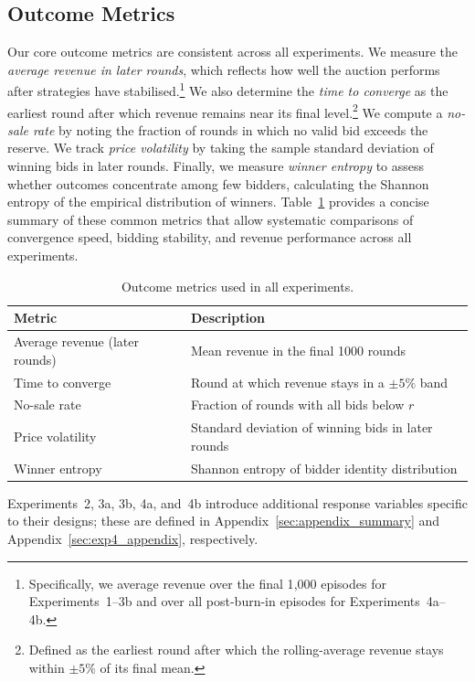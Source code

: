 \subsection{Outcome Metrics}

Our core outcome metrics are consistent across all experiments. We measure the \emph{average revenue in later rounds}, which reflects how well the auction performs after strategies have stabilised.\footnote{Specifically, we average revenue over the final 1{,}000 episodes for Experiments~1--3b and over all post-burn-in episodes for Experiments~4a--4b.} We also determine the \emph{time to converge} as the earliest round after which revenue remains near its final level.\footnote{Defined as the earliest round after which the rolling-average revenue stays within $\pm 5\%$ of its final mean.} We compute a \emph{no-sale rate} by noting the fraction of rounds in which no valid bid exceeds the reserve. We track \emph{price volatility} by taking the sample standard deviation of winning bids in later rounds. Finally, we measure \emph{winner entropy} to assess whether outcomes concentrate among few bidders, calculating the Shannon entropy of the empirical distribution of winners. Table~\ref{tab:outcomes} provides a concise summary of these common metrics that allow systematic comparisons of convergence speed, bidding stability, and revenue performance across all experiments.

\begin{table}[h]
\centering
\caption{Outcome metrics used in all experiments.}
\label{tab:outcomes}
\begin{tabular}{l l}
\toprule
\textbf{Metric} & \textbf{Description}\\
\midrule
Average revenue (later rounds) & Mean revenue in the final 1000 rounds \\
Time to converge & Round at which revenue stays in a $\pm 5\%$ band \\
No-sale rate & Fraction of rounds with all bids below $r$\\
Price volatility & Standard deviation of winning bids in later rounds \\
Winner entropy & Shannon entropy of bidder identity distribution \\
\bottomrule
\end{tabular}
\end{table}

Experiments~2, 3a, 3b, 4a, and~4b introduce additional response variables specific to their designs; these are defined in Appendix~\ref{sec:appendix_summary} and Appendix~\ref{sec:exp4_appendix}, respectively.

